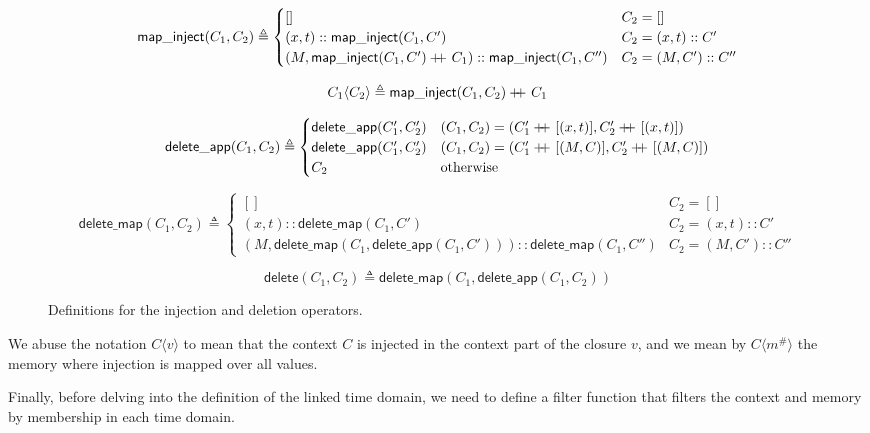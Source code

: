 \documentclass[acmsmall,screen,review]{acmart}
\theoremstyle{definition}
\newcommand*{\cons}{::}
\newcommand*{\A}[1]{{#1}^{\#}}
\newcommand*{\mem}{m}
\newcommand*{\mapinject}{\mathsf{map\_inject}}
\newcommand*{\inject}[2]{{#1}\langle{#2}\rangle}
\newcommand*{\deletepre}{\mathsf{delete\_app}}
\newcommand*{\deletemap}{\mathsf{delete\_map}}
\newcommand*{\delete}{\mathsf{delete}}
\newcommand*{\doubleplus}{+\kern-1.3ex+\kern0.8ex}
\begin{document}
\begin{figure}[htb]
  \footnotesize
  \[
    \mapinject(C_{1},C_{2})\triangleq
    \begin{cases}
      []                                                                   & C_{2}=[]              \\
      (x, t)\cons\mapinject(C_{1},C')                                      & C_{2}=(x,t)\cons C'   \\
      (M, \mapinject(C_{1},C')\doubleplus C_{1})\cons\mapinject(C_{1},C'') & C_{2}=(M,C')\cons C''
    \end{cases}
  \]

  \[
    \inject{C_{1}}{C_{2}}\triangleq \mapinject(C_{1},C_{2})\doubleplus C_{1}
  \]

  \[
    \deletepre(C_{1},C_{2})\triangleq
    \begin{cases}
      \deletepre(C_{1}',C_{2}') & (C_{1},C_{2})=(C_{1}'\doubleplus[(x,t)],C_{2}'\doubleplus[(x,t)]) \\
      \deletepre(C_{1}',C_{2}') & (C_{1},C_{2})=(C_{1}'\doubleplus[(M,C)],C_{2}'\doubleplus[(M,C)]) \\
      C_{2}                     & \text{otherwise}
    \end{cases}
  \]

  \[
    \deletemap(C_{1},C_{2})\triangleq
    \begin{cases}
      []                                                                    & C_{2}=[]               \\
      (x,t)\cons\deletemap(C_{1},C')                                        & C_{2}=(x,t):: C'       \\
      (M, \deletemap(C_{1},\deletepre(C_{1},C')))\cons\deletemap(C_{1},C'') & C_{2}=(M, C')\cons C''
    \end{cases}
  \]

  \[
    \delete(C_{1},C_{2})\triangleq \deletemap(C_{1},\deletepre(C_{1},C_{2}))
  \]
  \caption{Definitions for the injection and deletion operators.}
\end{figure}

We abuse the notation $\inject{C}{v}$ to mean that the context $C$ is injected in the context part of the closure $v$, and we mean by $\inject{C}{\A\mem}$ the memory where injection is mapped over all values.

Finally, before delving into the definition of the linked time domain, we need to define a filter function that filters the context and memory by membership in each time domain.
\end{document}
